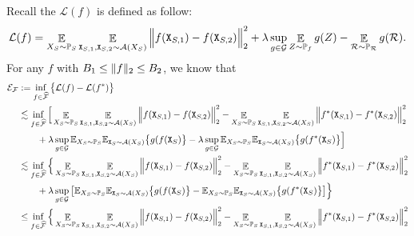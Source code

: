 Recall the $\mathcal{L}(f)$ is defined as follow:
\begin{align*}
    \mathcal{L}(f)=\mathop{\mathbb{E}}_{X_S \sim \mathbb{P}_S} \mathop{\mathbb{E}}_{\mathtt{X}_{S,1}, \mathtt{X}_{S,2} \sim \mathcal{A}(X_S)} \Big\Vert f(\mathtt{X}_{S,1}) - f(\mathtt{X}_{S,2}) \Big\Vert_2^2 + \lambda \sup_{g \in \mathcal{G}} \mathop{\mathbb{E}}_{Z \sim \mathbb{P}_f} g(Z)  - \mathop{\mathbb{E}}_{\mathcal{R} \sim \mathbb{P}_\mathcal{R}} g(\mathcal{R}).
\end{align*}
For any $f$ with $B_1\leq \Vert{f}\Vert_2 \leq B_2$, we know that
\begin{align*}
    \mathcal{E}_{\mathcal{F}} &:= \inf_{f \in \widehat{\mathcal{F}}}\big\{\mathcal{L}(f) - \mathcal{L}(f^*)\big\} \\
    &\lesssim \inf_{f \in \widehat{\mathcal{F}}}\Big[\mathop{\E}_{X_S \sim \P_S} \mathop{\E}_{\mathtt{X}_{S,1}, \mathtt{X}_{S,2} \sim \mathcal{A}(X_S)} \Big\Vert f(\mathtt{X}_{S,1}) - f(\mathtt{X}_{S,2}) \Big\Vert_2^2 -\mathop{\E}_{X_S \sim \P_S} \mathop{\E}_{\mathtt{X}_{S,1}, \mathtt{X}_{S,2} \sim \mathcal{A}(X_S)} \Big\Vert f^*(\mathtt{X}_{S,1}) - f^*(\mathtt{X}_{S,2}) \Big\Vert_2^2 \\
    &\qquad+ \lambda \sup_{g\in\mathcal{G}}\E_{X_S\sim\P_S}\E_{\mathtt{X}_S\sim\mathcal{A}(X_S)}\big\{g(f(\mathtt{X}_S)\big\} - \lambda \sup_{g\in\mathcal{G}}\E_{X_S\sim\P_S}\E_{\mathtt{X}_S\sim\mathcal{A}(X_S)}\big\{g(f^*(\mathtt{X}_S)\big\} \Big]  \\
    &\lesssim \inf_{f \in \widehat{\mathcal{F}}}\Big\{\mathop{\E}_{X_S \sim \P_S} \mathop{\E}_{\mathtt{X}_{S,1}, \mathtt{X}_{S,2} \sim \mathcal{A}(X_S)} \Big\Vert f(\mathtt{X}_{S,1}) - f(\mathtt{X}_{S,2}) \Big\Vert_2^2 -\mathop{\E}_{X_S \sim \P_S} \mathop{\E}_{\mathtt{X}_{S,1}, \mathtt{X}_{S,2} \sim \mathcal{A}(X_S)} \Big\Vert f^*(\mathtt{X}_{S,1}) - f^*(\mathtt{X}_{S,2}) \Big\Vert_2^2 \\
    &\qquad+ \lambda \sup_{g\in\mathcal{G}}\big[\E_{X_S\sim\P_S}\E_{\mathtt{X}_S\sim\mathcal{A}(X_S)}\big\{g(f(\mathtt{X}_S)\big\} - \E_{X_S\sim\P_S}\E_{\mathtt{X}_S\sim\mathcal{A}(X_S)}\big\{g(f^*(\mathtt{X}_S)\big\}\big] \Big\}  \\
    &\leq \inf_{f \in \widehat{\mathcal{F}}}\Big\{\mathop{\E}_{X_S \sim \P_S} \mathop{\E}_{\mathtt{X}_{S,1}, \mathtt{X}_{S,2} \sim \mathcal{A}(X_S)} \Big\Vert f(\mathtt{X}_{S,1}) - f(\mathtt{X}_{S,2}) \Big\Vert_2^2 -\mathop{\E}_{X_S \sim \P_S} \mathop{\E}_{\mathtt{X}_{S,1}, \mathtt{X}_{S,2} \sim \mathcal{A}(X_S)} \Big\Vert f^*(\mathtt{X}_{S,1}) - f^*(\mathtt{X}_{S,2}) \Big\Vert_2^2 \\

\end{align*}
